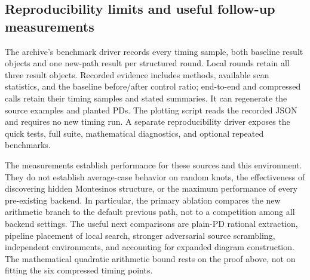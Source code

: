 \subsection{Reproducibility limits and useful follow-up measurements}

The archive's benchmark driver records every timing sample, both baseline
result objects and one new-path result per structured round. Local rounds
retain all three result objects. Recorded evidence includes methods, available
scan statistics, and the baseline before/after control ratio; end-to-end
and compressed calls retain their timing samples and stated summaries. It can regenerate the source examples and
planted PDs. The plotting script reads the recorded JSON and requires no
new timing run. A separate reproducibility driver exposes the quick tests,
full suite, mathematical diagnostics, and optional repeated benchmarks.

The measurements establish performance for these sources and this
environment. They do not establish average-case behavior on random knots,
the effectiveness of discovering hidden Montesinos structure, or the
maximum performance of every pre-existing backend. In particular, the
primary ablation compares the new arithmetic branch to the default
previous path, not to a competition among all backend settings.
The useful next comparisons are plain-PD rational extraction, pipeline
placement of local search, stronger adversarial source scrambling,
independent environments, and accounting for expanded diagram construction.
The mathematical quadratic arithmetic bound rests on the proof above,
not on fitting the six compressed timing points.

